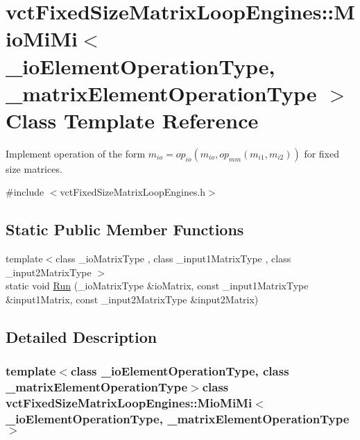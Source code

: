 \hypertarget{classvct_fixed_size_matrix_loop_engines_1_1_mio_mi_mi}{}\section{vct\+Fixed\+Size\+Matrix\+Loop\+Engines\+:\+:Mio\+Mi\+Mi$<$ \+\_\+io\+Element\+Operation\+Type, \+\_\+matrix\+Element\+Operation\+Type $>$ Class Template Reference}
\label{classvct_fixed_size_matrix_loop_engines_1_1_mio_mi_mi}


Implement operation of the form $m_{io} = op_{io}(m_{io}, op_{mm}(m_{i1}, m_{i2}))$ for fixed size matrices.  




{\ttfamily \#include $<$vct\+Fixed\+Size\+Matrix\+Loop\+Engines.\+h$>$}

\subsection*{Static Public Member Functions}
\begin{DoxyCompactItemize}
\item 
{\footnotesize template$<$class \+\_\+io\+Matrix\+Type , class \+\_\+input1\+Matrix\+Type , class \+\_\+input2\+Matrix\+Type $>$ }\\static void \hyperlink{classvct_fixed_size_matrix_loop_engines_1_1_mio_mi_mi_ad9d63b36eab33db52502a841e4fc4463}{Run} (\+\_\+io\+Matrix\+Type \&io\+Matrix, const \+\_\+input1\+Matrix\+Type \&input1\+Matrix, const \+\_\+input2\+Matrix\+Type \&input2\+Matrix)
\end{DoxyCompactItemize}


\subsection{Detailed Description}
\subsubsection*{template$<$class \+\_\+io\+Element\+Operation\+Type, class \+\_\+matrix\+Element\+Operation\+Type$>$class vct\+Fixed\+Size\+Matrix\+Loop\+Engines\+::\+Mio\+Mi\+Mi$<$ \+\_\+io\+Element\+Operation\+Type, \+\_\+matrix\+Element\+Operation\+Type $>$}

